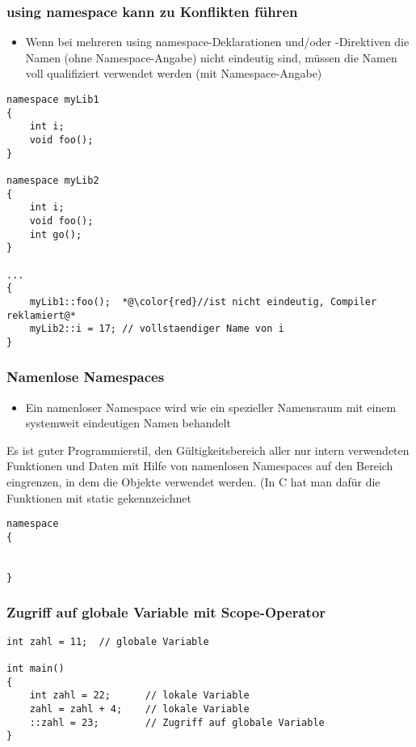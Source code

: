 \subsubsection{using namespace kann zu Konflikten führen\hfill}
\label{sec:unterunterabschnitt}
\begin{itemize}
	\item Wenn bei mehreren using namespace-Deklarationen und/oder -Direktiven die Namen (ohne Namespace-Angabe) nicht eindeutig sind, müssen die Namen voll qualifiziert verwendet werden (mit Namespace-Angabe)
\end{itemize}
\noindent
\begin{minipage}{\linewidth}
\begin{lstlisting}
namespace myLib1
{
	int i;
	void foo();
}

namespace myLib2
{
	int i;
	void foo();
	int go();
}

...
{
	myLib1::foo();	*@\color{red}//ist nicht eindeutig, Compiler reklamiert@*
	myLib2::i = 17;	// vollstaendiger Name von i
}
\end{lstlisting}
\end{minipage}

\subsubsection{Namenlose Namespaces\hfill}
\label{sec:unterunterabschnitt}
\begin{itemize}
	\item Ein namenloser Namespace wird wie ein spezieller Namensraum mit einem systemweit eindeutigen Namen behandelt
\end{itemize}
\begin{hinweis}
Es ist guter Programmierstil, den Gültigkeitsbereich aller nur intern verwendeten Funktionen und Daten mit Hilfe von namenlosen Namespaces auf den Bereich eingrenzen, in dem die Objekte verwendet werden. (In C hat man dafür die Funktionen mit static gekennzeichnet
\end{hinweis}
\noindent
\begin{minipage}{\linewidth}
\begin{lstlisting}
namespace
{


}
\end{lstlisting}
\end{minipage}

\subsubsection{Zugriff auf globale Variable mit Scope-Operator\hfill}
\label{sec:unterunterabschnitt}
\noindent
\begin{minipage}{\linewidth}
\begin{lstlisting}
int zahl = 11;	// globale Variable

int main()
{
	int zahl = 22;		// lokale Variable
	zahl = zahl + 4;	// lokale Variable
	::zahl = 23;		// Zugriff auf globale Variable
}
\end{lstlisting}
\end{minipage}

